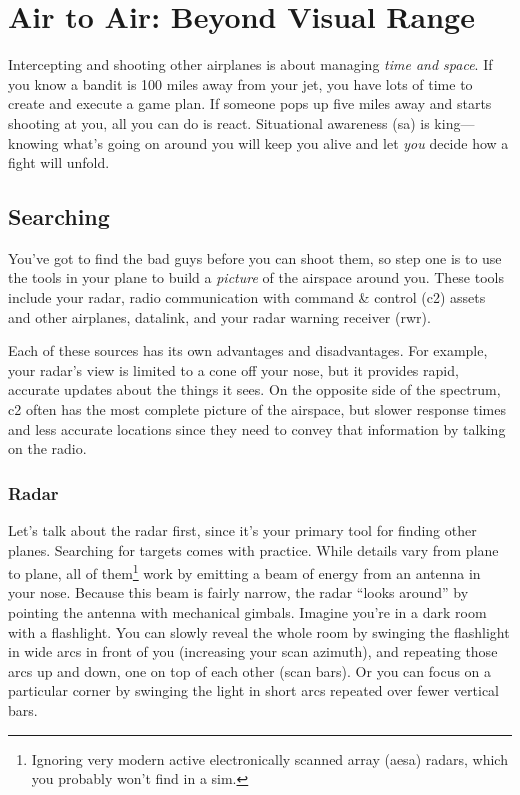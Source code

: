 \chapter{Air to Air: Beyond Visual Range}

Intercepting and shooting other airplanes is about managing \emph{time and space}.
If you know a bandit is 100 miles away from your jet,
you have lots of time to create and execute a game plan.
If someone pops up five miles away and starts shooting at you,
all you can do is react.
Situational awareness \ac{(sa)} is king---knowing what's going on around
you will keep you alive and let \emph{you} decide how a fight will unfold.

\section{Searching}

You've got to find the bad guys before you can shoot them,
so step one is to use the tools in your plane to build a \emph{picture}
of the airspace around you.
These tools include your radar,
radio communication with command \& control \ac{(c2)} assets
and other airplanes, datalink,
and your radar warning receiver \ac{(rwr)}.

Each of these sources has its own advantages and disadvantages.
For example,
your radar's view is limited to a cone off your nose,
but it provides rapid, accurate updates about the things it sees.
On the opposite side of the spectrum,
\ac{c2} often has the most complete picture of the airspace,
but slower response times and less accurate locations
since they need to convey that information by talking on the radio.

\subsection{Radar}

Let's talk about the radar first,
since it's your primary tool for finding other planes.
Searching for targets comes with practice.
While details vary from plane to plane,
all of them\footnote{Ignoring very modern active electronically scanned array
\ac{(aesa)} radars, which you probably won't find in a sim.}
work by emitting a beam of energy from an antenna in your nose.
Because this beam is fairly narrow,
the radar ``looks around'' by pointing the antenna with mechanical gimbals.
Imagine you're in a dark room with a flashlight.
You can slowly reveal the whole room by swinging the flashlight in wide arcs
in front of you (increasing your scan azimuth),
and repeating those arcs up and down, one on top of each other
(scan bars).
Or you can focus on a particular corner by swinging the light in short arcs
repeated over fewer vertical bars.

